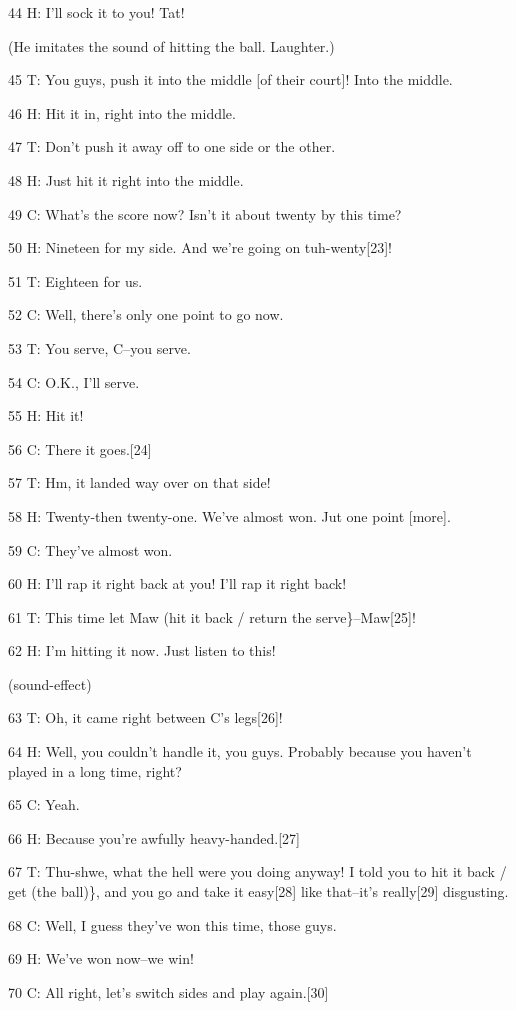 44 H: I'll sock it to you! Tat!

(He imitates the sound of hitting the ball. Laughter.)

45 T: You guys, push it into the middle [of their court]! Into the middle.

46 H: Hit it in, right into the middle.

47 T: Don't push it away off to one side or the other.

48 H: Just hit it right into the middle.

49 C: What's the score now? Isn't it about twenty by this time?

50 H: Nineteen for my side. And we're going on tuh-wenty[23]!

51 T: Eighteen for us.

52 C: Well, there's only one point to go now.

53 T: You serve, C--you serve.

54 C: O.K., I'll serve.

55 H: Hit it!

56 C: There it goes.[24]

57 T: Hm, it landed way over on that side!

58 H: Twenty-then twenty-one. We've almost won. Jut one point [more].

59 C: They've almost won.

60 H: I'll rap it right back at you! I'll rap it right back!

61 T: This time let Maw (hit it back / return the serve\}--Maw[25]!

62 H: I'm hitting it now. Just listen to this!

(sound-effect)

63 T: Oh, it came right between C's legs[26]!

64 H: Well, you couldn't handle it, you guys. Probably because you haven't played
in a long time, right?

65 C: Yeah.

66 H: Because you're awfully heavy-handed.[27]

67 T: Thu-shwe, what the hell were you doing anyway! I told you to hit it back
/ get (the ball)\}, and you go and take it easy[28] like that--it's really[29]
disgusting.

68 C: Well, I guess they've won this time, those guys.

69 H: We've won now--we win!

70 C: All right, let's switch sides and play again.[30]

